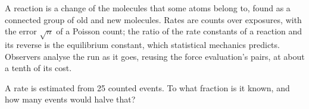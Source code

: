 \begin{keyidea}
A reaction is a change of the molecules that some atoms belong to, found
as a connected group of old and new molecules. Rates are counts over
exposures, with the error $\sqrt n$ of a Poisson count; the ratio of the
rate constants of a reaction and its reverse is the equilibrium constant,
which statistical mechanics predicts. Observers analyse the run as it goes,
reusing the force evaluation's pairs, at about a tenth of its cost.
\end{keyidea}


\begin{selfcheck}
A rate is estimated from 25 counted events. To what fraction is it known,
and how many events would halve that?
\end{selfcheck}

